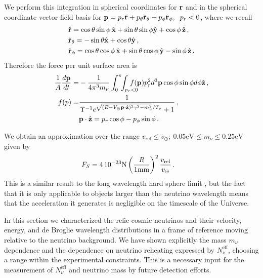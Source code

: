 We perform this integration in spherical coordinates for ${\bf r}$ and in the spherical coordinate vector field basis for ${\bf p}=p_r\hat{\bf r} +p_\theta\hat{\bf r}_\theta+p_\phi\hat{\bf r}_\phi,\hspace{2mm} p_r<0$, where we recall
\begin{align}
&\hat{\bf r}=\cos  \theta \sin \phi \, \hat{\bf x}+\sin \theta \sin \phi \hat{\bf y}+\cos  \phi\,\hat{\bf z}\notag\,,\\
&\hat{\bf r}_\theta=-\sin \theta \hat{\bf x}+\cos \theta \hat{\bf y}\,,\\
&\hat{\bf r}_\phi=\cos \theta \cos \phi\,\hat{\bf x}+\sin \theta \cos \phi \,\hat{\bf y}-\sin \phi \, \hat{\bf z}\notag\,.
\end{align}
Therefore the force per unit surface area is
\begin{align}\label{drag_eq}
\frac{1}{A}\frac{d{\bf p}}{dt}=&-\frac{1}{4\pi^3 m_\nu}\int_0^\pi\!\!\int_{p_r<0}\!\!\!\!\!\!\!\! f({\bf p}) p_r^2  d^3{\bf p}\cos \phi \sin \phi  d\phi\hat{\bf z}\,,\notag\\
f({\bf}p)=&\frac{1}{  \Upsilon^{-1}e^{\sqrt{( E-V_\oplus {\bf p}\cdot \hat {\bf z})^2\gamma^2-m_\nu^2}/T_\nu}+1 }\,,\\
          &{\bf p}\cdot\hat{\bf z}=p_r\cos \phi-p_\phi\sin\phi \,.\notag
\end{align}

We obtain an approximation over the range $v_{\text{rel}}\leq v_\oplus ;\ 0.05\text{eV}\leq m_\nu\leq 0.25\text{eV}$ given by
\begin{align}\label{drag_fit}
&F_S =  4\,10^{-23} \text{N}\left(\frac{R}{1{\rm mm}}\right)^2\frac{v_{\text{rel}}}{ v_\oplus}\,.
\end{align}
This is a similar result to the long wavelength hard sphere limit , but the fact that it is only applicable to objects larger than the neutrino wavelength means that the acceleration it generates is negligible on the timescale of the Universe.

In this section we characterized the relic cosmic neutrinos and their velocity, energy, and de Broglie wavelength distributions in a frame of reference moving relative to the neutrino background. We have shown explicitly the mass $m_\nu$ dependence and the dependence on neutrino reheating expressed by $N_\nu^{\mathrm{eff}}$, choosing a range within the experimental constraints. This is a necessary input for the measurement of $N_\nu^{\mathrm{eff}}$ and neutrino mass by future detection efforts.  

